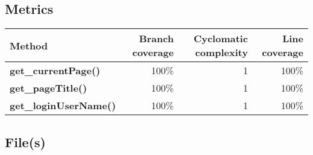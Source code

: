 \documentclass[a4paper,landscape,10pt]{article}
\begin{document}
\subsection{Metrics}
\begin{longtable}[l]{|l|r|r|r|}
\hline
\textbf{Method} & \textbf{Branch coverage} & \textbf{Cyclomatic complexity} & \textbf{Line coverage}\\
\hline
\textbf{get\_currentPage()} & 100\% & 1 & 100\%\\
\hline
\textbf{get\_pageTitle()} & 100\% & 1 & 100\%\\
\hline
\textbf{get\_loginUserName()} & 100\% & 1 & 100\%\\
\hline
\end{longtable}
\subsection{File(s)}
\end{document}
